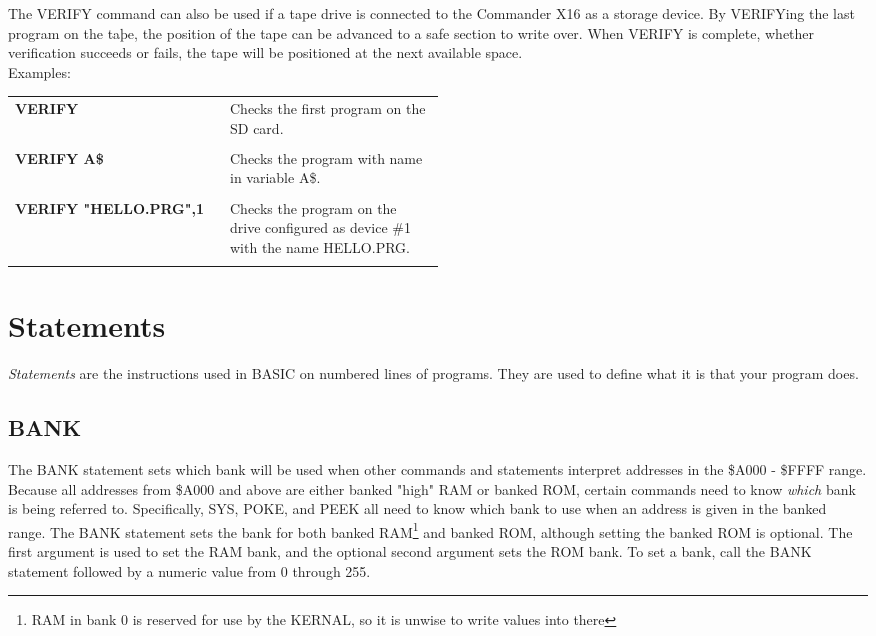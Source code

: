 The {\ttfamily VERIFY} command can also be used if a tape drive is connected to
the Commander X16 as a storage device.  By {\ttfamily VERIFY}ing the last
program on the taþe, the position of the tape can be advanced to a safe section
to write over.  When {\ttfamily VERIFY} is complete, whether verification
succeeds or fails, the tape will be positioned at the next available space.\\

Examples:\\

\begin{tabular}{l p{0.5\linewidth}}

	{\ttfamily\bfseries VERIFY}&Checks the first program on the SD card.\\\\

	{\ttfamily\bfseries VERIFY A\$}&Checks the program with name in variable
	{\ttfamily A\$}.\\\\

	{\ttfamily\bfseries VERIFY "HELLO.PRG",1}&Checks the program on the drive
	configured as device \#1 with the name {\ttfamily HELLO.PRG}.\\\\

\end{tabular}

\section{Statements}

\emph{Statements} are the instructions used in BASIC on numbered lines of
programs.  They are used to define what it is that your program does.\\

\subsection{BANK}

The {\ttfamily BANK} statement sets which bank will be used when other commands
and statements interpret addresses in the \$A000 - \$FFFF range.  Because all
addresses from \$A000 and above are either banked "high" RAM or banked ROM,
certain commands need to know \emph{which} bank is being referred to.
Specifically, {\ttfamily SYS}, {\ttfamily POKE}, and {\ttfamily PEEK} all need
to know which bank to use when an address is given in the banked range.  The
{\ttfamily BANK} statement sets the bank for both banked RAM\footnote{RAM in
bank 0 is reserved for use by the KERNAL, so it is unwise to write values into
there} and banked ROM, although setting the banked ROM is optional.  The first
argument is used to set the RAM bank, and the optional second argument sets the
ROM bank.  To set a bank, call the {\ttfamily BANK} statement followed by a
numeric value from 0 through 255.\\

